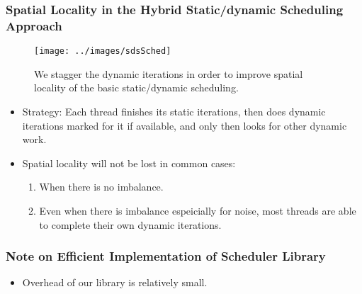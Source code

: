 \begin{frame}[label=sdsSched]
\frametitle{Spatial Locality in the Hybrid Static/dynamic Scheduling Approach}
\begin{center}
\begin{figure}
\texttt{[image: ../images/sdsSched]}
\caption{\small We stagger the dynamic iterations in order to improve spatial locality of the basic static/dynamic scheduling.}
\end{figure}
\end{center}

\begin{itemize}
\small \item \small Strategy: Each thread finishes its static iterations, then does dynamic iterations marked for it if available, and only then looks for other dynamic work. 
\item \small Spatial locality will not be lost in common cases: 
\begin{enumerate}
\small \item \small When there is no imbalance. 
\item \small Even when there is imbalance espeicially for noise, most threads are able to complete their own dynamic iterations.
\end{enumerate}
\end{itemize}
\end{frame}

\begin{frame}[label=efficientImpl]
\frametitle{Note on Efficient Implementation of Scheduler Library}
\begin{center}

\end{center}
\begin{itemize}
\small \item \small Overhead of our library is relatively small. 
\end{itemize}
\end{frame}

